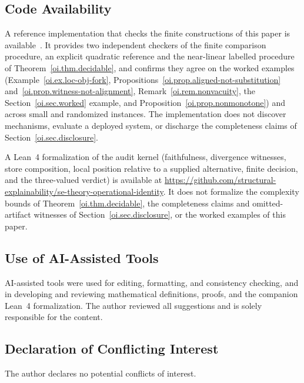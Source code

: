 \documentclass[11pt]{article}
\theoremstyle{plain}
\theoremstyle{definition}
\theoremstyle{remark}
\begin{document}
\subsection*{Code Availability}
A reference implementation that checks the finite constructions of this paper
is available~\citep{case2026oiverification}.
It provides two independent checkers of the finite comparison procedure,
an explicit quadratic reference and the near-linear labelled procedure
of Theorem~\ref{oi.thm.decidable},
and confirms they agree on the worked examples (Example~\ref{oi.ex.loc-obj-fork},
Propositions~\ref{oi.prop.aligned-not-substitution}
and~\ref{oi.prop.witness-not-alignment},
Remark~\ref{oi.rem.nonvacuity}, the Section~\ref{oi.sec.worked} example,
and Proposition~\ref{oi.prop.nonmonotone}) and across small and randomized instances.
The implementation does not discover
mechanisms, evaluate a deployed system, or discharge the completeness
claims of Section~\ref{oi.sec.disclosure}.

A Lean~4 formalization of the audit kernel
(faithfulness, divergence witnesses, store composition,
local position relative to a supplied alternative,
finite decision, and the three-valued verdict)
is available at
\url{https://github.com/structural-explainability/se-theory-operational-identity}.
It does not formalize the complexity bounds of Theorem~\ref{oi.thm.decidable},
the completeness claims and omitted-artifact witnesses of
Section~\ref{oi.sec.disclosure},
or the worked examples of this paper.

\subsection*{Use of AI-Assisted Tools}
AI-assisted tools were used for editing, formatting, and consistency checking,
and in developing and reviewing mathematical definitions, proofs,
and the companion Lean~4 formalization.
The author reviewed all suggestions and is solely responsible for the content.

\subsection*{Declaration of Conflicting Interest}
The author declares no potential conflicts of interest.
\end{document}
